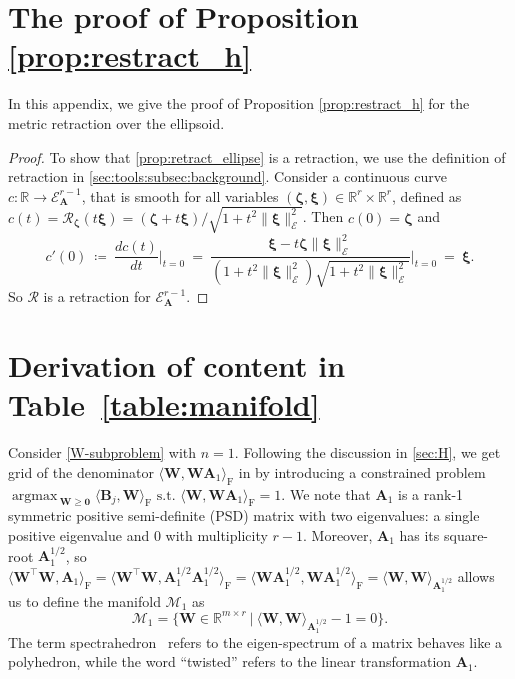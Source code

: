 \documentclass[sn-mathphys-num]{sn-jnl}
\DeclareMathOperator*{\argmax}{\textrm{argmax}\,} %
\def\st              {\,\textrm{s.t.}\,} %
\def\zeros           {\bm{0}}            %
\def\IR  {\mathbb{R}} 	    %
\def\IRr {\IR^{r}} 			%
\def\IRmr{\IR^{m \times r}} %
\def\A {\bm{A}}
\def\B {\bm{B}}
\def\W {\bm{W}}
\def\cE { \mathcal{E}}
\def\cM { \mathcal{M}}
\def\cR { \mathcal{R}}
\def\bzeta    {\boldsymbol{\zeta}}
\def\bxi      {\boldsymbol{\xi}}
\begin{document}
\section{The proof of Proposition \ref{prop:restract_h}}
\label{app:proof_retract_h}
In this appendix, we give the proof of Proposition \ref{prop:restract_h} for the metric retraction over the ellipsoid.
\begin{proof}
To show that \eqref{prop:retract_ellipse} is a retraction, we use the definition of retraction in \textsection\ref{sec:tools:subsec:background}.
Consider a continuous curve $c:\IR\rightarrow\cE_{\A}^{r-1}$, that is smooth for all variables $(\bzeta, \bxi) \in \IRr\times \IRr$, defined as 
$c(t) = \cR_{\bzeta}(t\bxi) = (\bzeta + t\bxi)/ \sqrt{1 + t^2\| \bxi\|_\cE^2}$.
Then $c(0)=\bzeta$ and
\[
c'(0) 
~\coloneqq~
\dfrac{d c(t)}{d t}\bigg|_{t=0}
~=~
\dfrac{\bxi-t\bzeta\|\bxi\|_\cE^2}{(1+t^2\|\bxi\|_\cE^2)\sqrt{1+t^2\|\bxi\|_\cE^2}}\bigg|_{t=0} 
~=~
\bxi.
\]
So $\cR$ is a retraction for $\cE_{\A}^{r-1}$. 
\end{proof}





\section{Derivation of content in Table~\ref{table:manifold}}\label{sec:W:subsect:singleW}
Consider \eqref{W-subproblem} with $n=1$. 
Following the discussion in \textsection\ref{sec:H}, we get grid of the denominator $\langle \W, \W\A_1 \rangle_\textrm{F} $ in by introducing a constrained problem 
$ \argmax_{\W\geq \zeros}
\langle \B_j , \W \rangle_\textrm{F} \,\st\, \langle \W, \W \A_1 \rangle_\textrm{F} = 1
$.
We note that $\A_1$ is a rank-1 symmetric positive semi-definite (PSD) matrix with two eigenvalues: a single positive eigenvalue and $0$ with multiplicity $r-1$.
Moreover, $\A_1$ has its square-root $\A^{1/2}_1$, so 
$
\langle\W^\top\W,\A_1\rangle_\textrm{F}=
\langle\W^\top\W,\A^{1/2}_1\A^{1/2}_1\rangle_\textrm{F}=
\langle\W\A^{1/2}_1,\W\A^{1/2}_1\rangle_\textrm{F}=
\langle\W, \W\rangle_{\A^{1/2}_1}
$ allows us to define the manifold $\cM_1$ as
\begin{equation}\label{eq:matrix_man}
\cM_1
=
\Big\{
\W\in\IRmr ~|~
\langle\W, \W\rangle_{\A^{1/2}_1} - 1 = 0
\Big\}.
\tag{Shell of twisted spectrahedron}
\end{equation}
The term spectrahedron~\cite{ramana1995some} refers to the eigen-spectrum of a matrix behaves like a polyhedron, while the word ``twisted'' refers to the linear transformation $\A_1$.
\\
\end{document}
